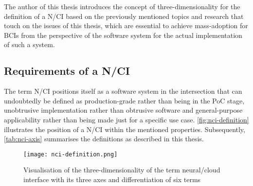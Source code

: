 The author of this thesis introduces the concept of three-dimensionality for the definition of a N/CI based on the previously mentioned topics and research that touch on the issues of this thesis, which are essential to achieve mass-adoption for BCIs from the perspective of the software system for the actual implementation of such a system.

\subsection{Requirements of a N/CI}
\label{chapter2-requirements-of-a-nci}

The term N/CI positions itself as a software system in the intersection that can undoubtedly be defined as production-grade rather than being in the PoC stage, unobtrusive implementation rather than obtrusive software and general-purpose applicability rather than being made just for a specific use case. \autoref{fig:nci-definition} illustrates the position of a N/CI within the mentioned properties. Subsequently, \autoref{tab:nci-axis} summarises the definitions as described in this thesis.

\begin{figure}[ht]
  \centering
  \texttt{[image: nci-definition.png]}
  \caption{Visualisation of the three-dimensionality of the term neural/cloud interface with its three axes and differentiation of six terms}
  \label{fig:nci-definition}
\end{figure}


